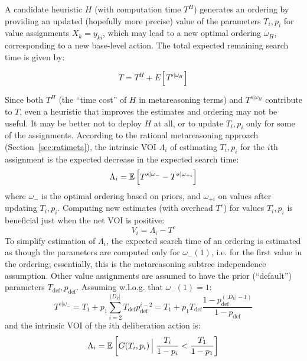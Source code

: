A candidate heuristic $H$ (with computation time $T^H$)  generates
an ordering by providing an updated (hopefully more precise)
value of the parameters $T_i, p_i$ for value assignments
$X_k=y_{ki}$, which may lead to a new optimal ordering $\omega_H$,
corresponding to a new base-level action.  The total expected
remaining search time is given by:

\begin{equation}
\label{eq:net-expected-time}
T=T^H+E[T^{s|\omega_H}]
\end{equation}

Since both $T^H$ (the ``time cost'' of $H$ in metareasoning terms)
and $T^{s|\omega_H}$ contribute to $T$, even a heuristic that
improves the estimates and ordering may not be useful.  It may be better not
to deploy $H$ at all, or to update $T_i, p_i$ only for some of the assignments.
According to the rational metareasoning approach (Section~\ref{sec:ratimeta}),
the intrinsic VOI $\Lambda_i$ of estimating $T_i, p_i$ for the $i$th assignment
is the expected decrease in the expected search time:
\begin{equation}
\label{eq:value-ordering-benefit}
\Lambda_i=\mathbb{E}\left[T^{s|\omega_-}-T^{s|\omega_{+i}}\right]
\end{equation}
where $\omega_-$ is the optimal ordering based on priors,
and $\omega_{+i}$ on values after updating $T_i, p_i$.
Computing new estimates (with overhead $T^c$) for values $T_i, p_i$
is beneficial just when the net VOI is positive:
\begin{equation}
\label{eq:voi}
V_i=\Lambda_i-T^c
\end{equation}
To simplify estimation of $\Lambda_i$, the expected
search time of an ordering is estimated as though the parameters are
computed only for $\omega_-(1)$, i.e. for the first value in the ordering;
essentially, this is the metareasoning subtree independence assumption.
 Other value assignments are assumed to have the prior (``default'')
parameters $T_\mathrm{def}, p_\mathrm{def}$. Assuming w.l.o.g. that $\omega_-(1)=1$:
\begin{equation}
\label{eq:time-estimate}
T^{s|\omega_-}=T_1+p_1\sum_{i=2}^{|D_k|}T_\mathrm{def}p_\mathrm{def}^{i-2}
   =T_1+p_1T_\mathrm{def}\frac{1-p_\mathrm{def}^{(|D_k|-1)}} {1-p_\mathrm{def}}
\end{equation}
and the intrinsic VOI of the $i$th deliberation action is:
\begin{equation}
\label{eq:benefit-estimate}
\Lambda_i=\mathbb{E}\left[G(T_i, p_i)\,\Big|\;\frac {T_i} {1-p_i} < \frac {T_1} {1-p_1}\right]
\end{equation}
